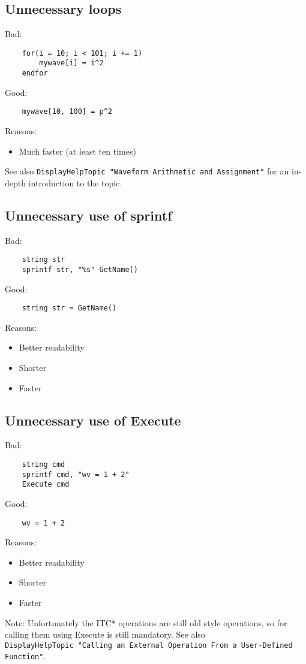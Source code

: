 \documentclass{scrartcl}
\begin{document}
\subsection{Unnecessary loops}
Bad:
\begin{verbatim}
	for(i = 10; i < 101; i += 1)
		mywave[i] = i^2
	endfor
\end{verbatim}
Good:
\begin{verbatim}
	mywave[10, 100] = p^2
\end{verbatim}
Reasons:
\begin{itemize}
	\item Much faster (at least ten times)
\end{itemize}
See also \texttt{DisplayHelpTopic "Waveform Arithmetic and Assignment"} for an in-depth introduction to the topic.
%
\subsection{Unnecessary use of sprintf}
Bad:
\begin{verbatim}
	string str
	sprintf str, "%s" GetName()
\end{verbatim}
Good:
\begin{verbatim}
	string str = GetName()
\end{verbatim}
Reasons:
\begin{itemize}
  \item Better readability
  \item Shorter
  \item Faster
\end{itemize}
%
\subsection{Unnecessary use of Execute}
Bad:
\begin{verbatim}
	string cmd
	sprintf cmd, "wv = 1 + 2"
	Execute cmd
\end{verbatim}
Good:
\begin{verbatim}
	wv = 1 + 2
\end{verbatim}
\pagebreak
Reasons:
\begin{itemize}
  \item Better readability
  \item Shorter
  \item Faster
\end{itemize}
%
Note: Unfortunately the ITC* operations are still old style operations, so for calling them using Execute is still mandatory. See also \\
\texttt{DisplayHelpTopic "Calling an External Operation From a User-Defined Function"}.
%
\end{document}
